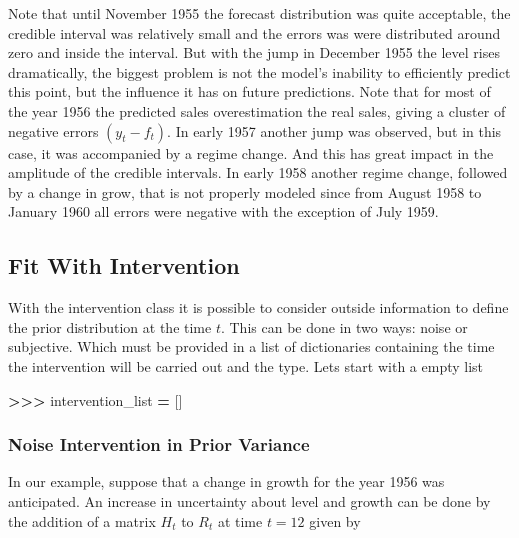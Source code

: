 \documentclass[
]{article}
\newenvironment{Shaded}{\begin{snugshade}}{\end{snugshade}}
\newcommand{\NormalTok}[1]{#1}
\newcommand{\OperatorTok}[1]{\textcolor[rgb]{0.81,0.36,0.00}{\textbf{#1}}}
\begin{document}
Note that until November 1955 the forecast distribution was quite
acceptable, the credible interval was relatively small and the errors
was were distributed around zero and inside the interval. But with the
jump in December 1955 the level rises dramatically, the biggest problem
is not the model's inability to efficiently predict this point, but the
influence it has on future predictions. Note that for most of the year
1956 the predicted sales overestimation the real sales, giving a cluster
of negative errors \((y_t - f_t)\). In early 1957 another jump was
observed, but in this case, it was accompanied by a regime change. And
this has great impact in the amplitude of the credible intervals. In
early 1958 another regime change, followed by a change in grow, that is
not properly modeled since from August 1958 to January 1960 all errors
were negative with the exception of July 1959.

\hypertarget{fit-with-intervention}{%
\subsection{Fit With Intervention}\label{fit-with-intervention}}

With the intervention class it is possible to consider outside
information to define the prior distribution at the time \(t\). This can
be done in two ways: noise or subjective. Which must be provided in a
list of dictionaries containing the time the intervention will be
carried out and the type. Lets start with a empty list

\begin{Shaded}
\begin{Highlighting}[]
\OperatorTok{\textgreater{}\textgreater{}\textgreater{}}\NormalTok{ intervention\_list }\OperatorTok{=}\NormalTok{ []}
\end{Highlighting}
\end{Shaded}

\hypertarget{noise-intervention-in-prior-variance}{%
\subsubsection{Noise Intervention in Prior
Variance}\label{noise-intervention-in-prior-variance}}

In our example, suppose that a change in growth for the year 1956 was
anticipated. An increase in uncertainty about level and growth can be
done by the addition of a matrix \(H_t\) to \(R_t\) at time \(t=12\)
given by
\end{document}
